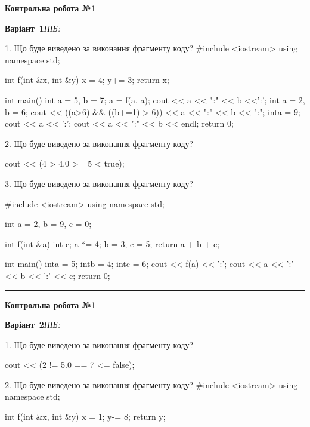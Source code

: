 \documentclass[11pt]{article}
\begin{document}
{\large\textbf{Контрольна робота №1}}

\textbf{Варіант \No\,1}\hfill \textit{ПІБ:}\,\underline{\hspace{60mm}}
\vspace{4mm}

1. Що буде виведено за виконання фрагменту коду?
#include <iostream>
using namespace std;

int f(int &x, int &y){
    x = 4;
    y+= 3;
    return x;
}

int main(){
    int a = 5, b = 7;
    a = f(a, a);
    cout << a << ":" << b <<':';
    {
        int a = 2, b = 6;
        cout << ((a>6) && ((b+=1) > 6))
             << a << ":" << b << ":";
    }
    {
        inta = 9;
        cout << a << ':';
    }
    cout << a << ":" << b << endl;
    return 0;
}


2. Що буде виведено за виконання фрагменту коду?

cout << (4 > 4.0 >= 5 < true);

3. Що буде виведено за виконання фрагменту коду?

#include <iostream>
using namespace std;

int a = 2, b = 9, c = 0;

int f(int &a){
int c;    a *= 4;
    b = 3;
    c = 5;
    return a + b + c;
}

int main(){
    inta = 5;
    intb = 4;
    intc = 6;
    cout << f(a) << ':';
    cout << a << ':' << b << ':' << c;
    return 0; 
}




\vspace{10mm}
\noindent\rule{\textwidth}{0.3pt}
\vspace{8mm}
{\large\textbf{Контрольна робота №1}}

\textbf{Варіант \No\,2}\hfill \textit{ПІБ:}\,\underline{\hspace{60mm}}
\vspace{4mm}

1. Що буде виведено за виконання фрагменту коду?

cout << (2 != 5.0 == 7 <= false);

2. Що буде виведено за виконання фрагменту коду?
#include <iostream>
using namespace std;

int f(int &x, int &y){
    x = 1;
    y-= 8;
    return y;
}
\end{document}
